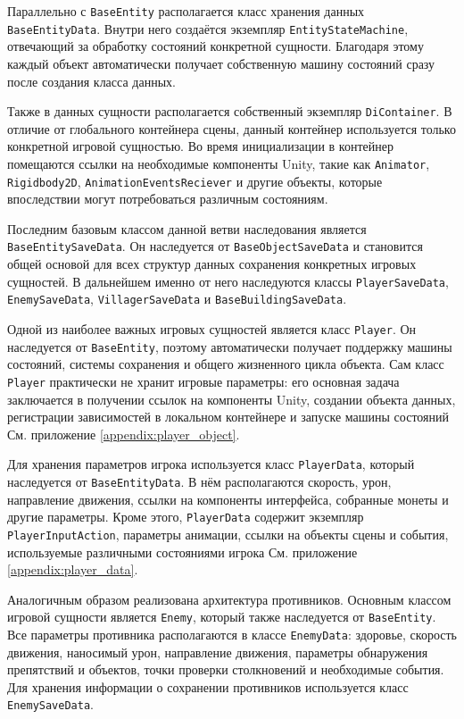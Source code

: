\documentclass[a4paper,12pt]{report}
\begin{document}
Параллельно с \texttt{BaseEntity} располагается класс хранения данных \texttt{BaseEntityData}. Внутри него создаётся экземпляр \texttt{EntityStateMachine}, отвечающий за обработку состояний конкретной сущности. Благодаря этому каждый объект автоматически получает собственную машину состояний сразу после создания класса данных.

Также в данных сущности располагается собственный экземпляр \texttt{DiContainer}. В отличие от глобального контейнера сцены, данный контейнер используется только конкретной игровой сущностью. Во время инициализации в контейнер помещаются ссылки на необходимые компоненты Unity, такие как \texttt{Animator}, \texttt{Rigidbody2D}, \texttt{AnimationEventsReciever} и другие объекты, которые впоследствии могут потребоваться различным состояниям.

Последним базовым классом данной ветви наследования является \texttt{BaseEntitySaveData}. Он наследуется от \texttt{BaseObjectSaveData} и становится общей основой для всех структур данных сохранения конкретных игровых сущностей. В дальнейшем именно от него наследуются классы \texttt{PlayerSaveData}, \texttt{EnemySaveData}, \texttt{VillagerSaveData} и \texttt{BaseBuildingSaveData}.

Одной из наиболее важных игровых сущностей является класс \texttt{Player}. Он наследуется от \texttt{BaseEntity}, поэтому автоматически получает поддержку машины состояний, системы сохранения и общего жизненного цикла объекта. Сам класс \texttt{Player} практически не хранит игровые параметры: его основная задача заключается в получении ссылок на компоненты Unity, создании объекта данных, регистрации зависимостей в локальном контейнере и запуске машины состояний См. приложение \ref{appendix:player_object}.

Для хранения параметров игрока используется класс \texttt{PlayerData}, который наследуется от \texttt{BaseEntityData}. В нём располагаются скорость, урон, направление движения, ссылки на компоненты интерфейса, собранные монеты и другие параметры. Кроме этого, \texttt{PlayerData} содержит экземпляр \texttt{PlayerInputAction}, параметры анимации, ссылки на объекты сцены и события, используемые различными состояниями игрока См. приложение \ref{appendix:player_data}.

Аналогичным образом реализована архитектура противников. Основным классом игровой сущности является \texttt{Enemy}, который также наследуется от \texttt{BaseEntity}. Все параметры противника располагаются в классе \texttt{EnemyData}: здоровье, скорость движения, наносимый урон, направление движения, параметры обнаружения препятствий и объектов, точки проверки столкновений и необходимые события. Для хранения информации о сохранении противников используется класс \texttt{EnemySaveData}.
\end{document}
